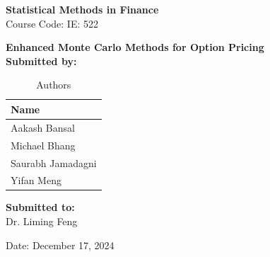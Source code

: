 
    \vspace*{2cm} %
    
    \begin{center}
        
    {\LARGE \textbf{Statistical Methods in Finance}} \\[0.5cm] %
    {\large Course Code: IE: 522} \\[0.5cm] %
    
    \vspace{2cm} %
    
    {\Large \textbf{Enhanced Monte Carlo Methods for Option Pricing}} \\[1cm] %
    
    \textbf{Submitted by:}

\begin{table}[h!]
\centering
\begin{tabular}{|l|}
\hline
\textbf{Name} \\ \hline
Aakash Bansal \\ \hline
Michael Bhang \\ \hline
Saurabh Jamadagni \\ \hline
Yifan Meng \\ \hline
\end{tabular}
\caption{ Authors}
\label{tab:uin_names}
\end{table}

    
    \vspace{1.5cm}
    
    \textbf{Submitted to:} \\[0.2cm]
    {\large Dr. Liming Feng} \\ %
    
    \vfill %
    
    {\large Date: December 17, 2024} %

\end{center}

